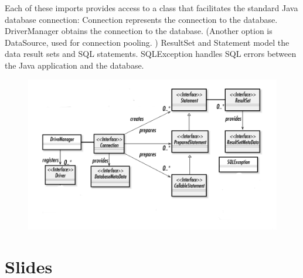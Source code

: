 Each of these imports provides access to a class that facilitates the standard Java database connection:
Connection represents the connection to the database.
DriverManager obtains the connection to the database. (Another option is DataSource, used for connection pooling. )
ResultSet and Statement model the data result sets and SQL statements.
SQLException handles SQL errors between the Java application and the database.


\begin{figure}[t]
\includegraphics[width=\textwidth]{./images/chapter4/jdbc_diagram.png}
\centering
\end{figure}

\section{Slides}

% 
